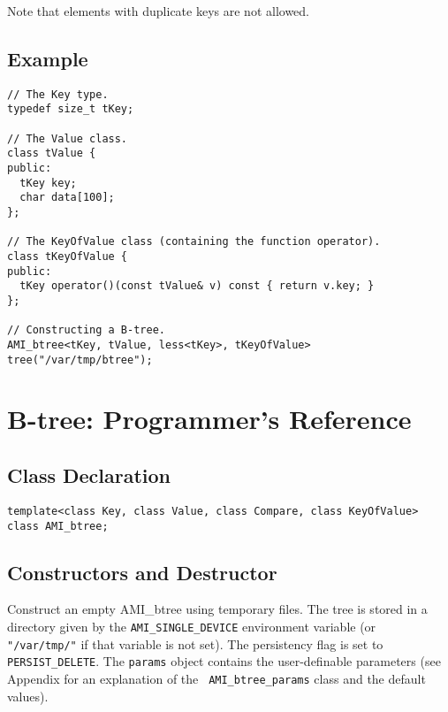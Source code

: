 Note that elements with duplicate keys are not allowed.


\section{Example}
{\small
\begin{verbatim}
// The Key type.
typedef size_t tKey;

// The Value class.
class tValue {
public:
  tKey key;
  char data[100];
};

// The KeyOfValue class (containing the function operator).
class tKeyOfValue {
public:
  tKey operator()(const tValue& v) const { return v.key; }
};

// Constructing a B-tree.
AMI_btree<tKey, tValue, less<tKey>, tKeyOfValue> tree("/var/tmp/btree");
\end{verbatim}
}

\chapter{B-tree: Programmer's Reference}

\section{Class Declaration}
\btabb

   \> {\tt template<class Key, class Value, class Compare, class
   KeyOfValue> class AMI\_btree;}

\etabb

\section{Constructors and Destructor}

\btabb

   {Construct an empty AMI\_btree using temporary files. The tree is stored in a
   directory given by the {\tt AMI\_SINGLE\_DEVICE} environment variable (or {\tt
   "/var/tmp/"} if that variable is not set). The persistency flag is set to
   {\tt PERSIST\_DELETE}. The {\tt params} object contains the
   user-definable parameters (see Appendix for an explanation of the {\tt
   AMI\_btree\_params} class and the default values).}

